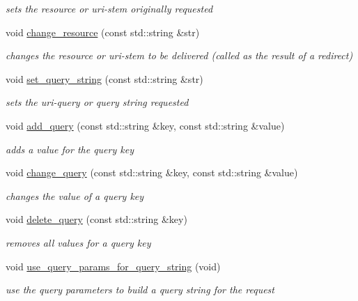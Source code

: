 \begin{DoxyCompactItemize}
\begin{DoxyCompactList}\small\item\em sets the resource or uri-\/stem originally requested \end{DoxyCompactList}\item 
void \hyperlink{classpion_1_1http_1_1request_a2e0eff2dbba55adc260b13a8be013e8c}{change\-\_\-resource} (const std\-::string \&str)
\begin{DoxyCompactList}\small\item\em changes the resource or uri-\/stem to be delivered (called as the result of a redirect) \end{DoxyCompactList}\item 
void \hyperlink{classpion_1_1http_1_1request_adbcb876e6bf19efb6a84802d90347e2b}{set\-\_\-query\-\_\-string} (const std\-::string \&str)
\begin{DoxyCompactList}\small\item\em sets the uri-\/query or query string requested \end{DoxyCompactList}\item 
void \hyperlink{classpion_1_1http_1_1request_a4167f9aed250f3f7cb6d935b5787bbba}{add\-\_\-query} (const std\-::string \&key, const std\-::string \&value)
\begin{DoxyCompactList}\small\item\em adds a value for the query key \end{DoxyCompactList}\item 
void \hyperlink{classpion_1_1http_1_1request_a5bc1d88faa0f3bb054f32c7ff0257f3b}{change\-\_\-query} (const std\-::string \&key, const std\-::string \&value)
\begin{DoxyCompactList}\small\item\em changes the value of a query key \end{DoxyCompactList}\item 
void \hyperlink{classpion_1_1http_1_1request_acfcd67cdc0c390f3c264935718fe0b57}{delete\-\_\-query} (const std\-::string \&key)
\begin{DoxyCompactList}\small\item\em removes all values for a query key \end{DoxyCompactList}\item 
void \hyperlink{classpion_1_1http_1_1request_aa3dd2b6074201004ea631051367b21d7}{use\-\_\-query\-\_\-params\-\_\-for\-\_\-query\-\_\-string} (void)
\begin{DoxyCompactList}\small\item\em use the query parameters to build a query string for the request \end{DoxyCompactList}\item 

\end{DoxyCompactItemize}
